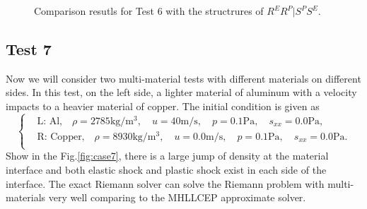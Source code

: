\documentclass[review]{elsarticle}
\begin{document}
\begin{enumerate}[Step 1]
\begin{figure}
    \caption{Comparison resutls for Test 6 with the structrures of $R^ER^P|S^PS^E$.  }
  \label{fig:case9}
\end{figure}
\subsection{Test 7}
Now we will consider two multi-material tests with different materials on different sides. In this test, on the left side, a lighter material of aluminum with a velocity impacts to a heavier material of copper. The initial condition is given as
\begin{equation}
 \left\{ \begin{aligned}
	 &	 \text{L: Al,}\quad  \rho = 2785 \text{kg}/\text{m}^3, \quad  u = 40\text{m}/\text{s}, \quad  p = 0.1\text{Pa}, \quad  s_{xx}=0.0\text{Pa},\\
	 &	 \text{R: Copper,}\quad  \rho = 8930\text{kg}/\text{m}^3, \quad  u = 0.0\text{m}/\text{s}, \quad  p =0.1\text{Pa}, \quad  s_{xx}=0.0\text{Pa}.\\
   \end{aligned}
 \right.
\end{equation}
Show in the Fig.\ref{fig:case7}, there is a large jump of density at the material interface and  both elastic shock and plastic shock exist in each side of the interface. The exact Riemann solver can solve the Riemann problem with multi-materials very well comparing to the MHLLCEP approximate solver.


\end{enumerate}
\end{document}
